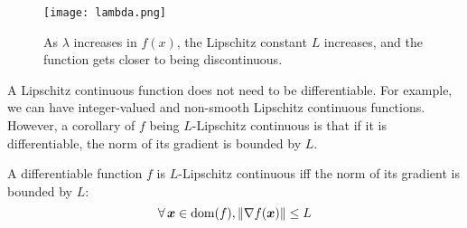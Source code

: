 \documentclass{article}
\begin{document}
\begin{figure}[ht]
\centering
    \texttt{[image: lambda.png]}
    \vspace{-10px}
    \caption{As $\lambda$ increases in $f(x)$, the Lipschitz constant $L$ increases, and the function gets closer to being discontinuous.}
    \label{fig:lambda}
\end{figure}

A Lipschitz continuous function does not need to be differentiable. 
For example, we can have integer-valued and non-smooth Lipschitz continuous functions.
However, a corollary of $f$ being $L$-Lipschitz continuous is that if it is differentiable, the norm of its gradient is bounded by $L$.

\begin{lemma}\label{lemma:lip}
    A differentiable function $f$ is $L$-Lipschitz continuous iff the norm of its gradient is bounded by $L$:
    \[
    \forall \vx \in \dom(f), \norm{\nabla f(\vx)} \leq L
    \]
\end{lemma}{}
\end{document}
